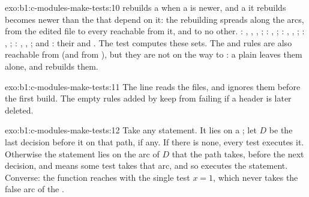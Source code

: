 \begin{solution}{exo:b1:c-modules-make-tests:10}
 rebuilds a  when a  is newer, and a  it rebuilds becomes newer than the  that
depend on it: the rebuilding spreads along the arcs, from the edited file to every  reachable from it, and to no
other. : , , , ; : ,
; : , , ; : , ;
: , , ;  and : their  and . The test  computes these sets. The  and
 rules are also reachable from  (and  from ), but they are not
on the way to : a plain  leaves them alone, and  rebuilds them.
\end{solution}

\begin{solution}{exo:b1:c-modules-make-tests:11}
The  line reads the  files, and ignores them before the first build. The empty rules added by
 keep  from failing if a header is later deleted.
\end{solution}

\begin{solution}{exo:b1:c-modules-make-tests:12}
Take any statement. It lies on a ; let $D$ be the last decision before it on that path, if any. If there
is none, every test executes it. Otherwise the statement lies on the arc of $D$ that the path takes, before the next
decision, and  means some test takes that arc, and so executes the statement. Converse: the function
 reaches  with the single test
$x = 1$, which never takes the false arc of the .
\end{solution}

